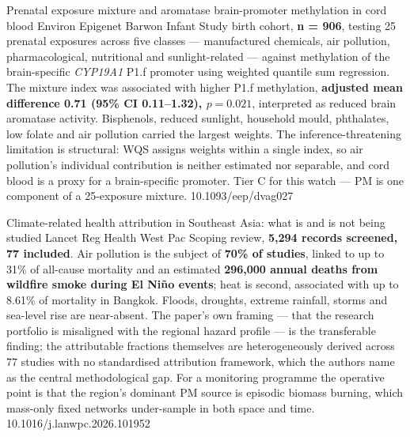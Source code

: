 \documentclass[10pt]{article}
\begin{document}

{Prenatal exposure mixture and aromatase brain-promoter methylation in cord blood}
{Environ Epigenet}
{Barwon Infant Study birth cohort, \textbf{n = 906}, testing 25 prenatal exposures across
five classes --- manufactured chemicals, air pollution, pharmacological, nutritional and
sunlight-related --- against methylation of the brain-specific \textit{CYP19A1} P1.f promoter
using weighted quantile sum regression. The mixture index was associated with higher P1.f
methylation, \textbf{adjusted mean difference 0.71 (95\% CI 0.11--1.32), $p=0.021$},
interpreted as reduced brain aromatase activity. Bisphenols, reduced sunlight, household
mould, phthalates, low folate and air pollution carried the largest weights. The
inference-threatening limitation is structural: WQS assigns weights within a single index,
so air pollution's individual contribution is neither estimated nor separable, and cord
blood is a proxy for a brain-specific promoter. Tier C for this watch --- PM is one component
of a 25-exposure mixture.}
{10.1093/eep/dvag027}


{Climate-related health attribution in Southeast Asia: what is and is not being studied}
{Lancet Reg Health West Pac}
{Scoping review, \textbf{5{,}294 records screened, 77 included}. Air pollution is the subject
of \textbf{70\% of studies}, linked to up to 31\% of all-cause mortality and an estimated
\textbf{296{,}000 annual deaths from wildfire smoke during El Ni\~no events}; heat is second,
associated with up to 8.61\% of mortality in Bangkok. Floods, droughts, extreme rainfall,
storms and sea-level rise are near-absent. The paper's own framing --- that the research
portfolio is misaligned with the regional hazard profile --- is the transferable finding; the
attributable fractions themselves are heterogeneously derived across 77 studies with no
standardised attribution framework, which the authors name as the central methodological gap.
For a monitoring programme the operative point is that the region's dominant PM source is
episodic biomass burning, which mass-only fixed networks under-sample in both space and time.}
{10.1016/j.lanwpc.2026.101952}

\end{document}
